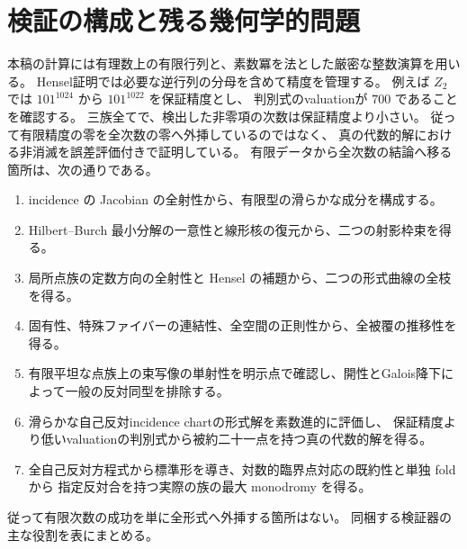 \section{検証の構成と残る幾何学的問題}
本稿の計算には有理数上の有限行列と、素数冪を法とした厳密な整数演算を用いる。
Hensel証明では必要な逆行列の分母を含めて精度を管理する。
例えば $Z_2$ では $101^{1024}$ から $101^{1022}$ を保証精度とし、
判別式のvaluationが $700$ であることを確認する。
三族全てで、検出した非零項の次数は保証精度より小さい。
従って有限精度の零を全次数の零へ外挿しているのではなく、
真の代数的解における非消滅を誤差評価付きで証明している。
有限データから全次数の結論へ移る箇所は、次の通りである。
\begin{enumerate}
\item incidence の Jacobian の全射性から、有限型の滑らかな成分を構成する。
\item Hilbert--Burch 最小分解の一意性と線形核の復元から、二つの射影枠束を得る。
\item 局所点族の定数方向の全射性と Hensel の補題から、二つの形式曲線の全枝を得る。
\item 固有性、特殊ファイバーの連結性、全空間の正則性から、全被覆の推移性を得る。
\item 有限平坦な点族上の束写像の単射性を明示点で確認し、開性とGalois降下によって一般の反対同型を排除する。
\item 滑らかな自己反対incidence chartの形式解を素数進的に評価し、
保証精度より低いvaluationの判別式から被約二十一点を持つ真の代数的解を得る。
\item 全自己反対方程式から標準形を導き、対数的臨界点対応の既約性と単独 fold から
指定反対合を持つ実際の族の最大 monodromy を得る。
\end{enumerate}
従って有限次数の成功を単に全形式へ外挿する箇所はない。
同梱する検証器の主な役割を表にまとめる。
